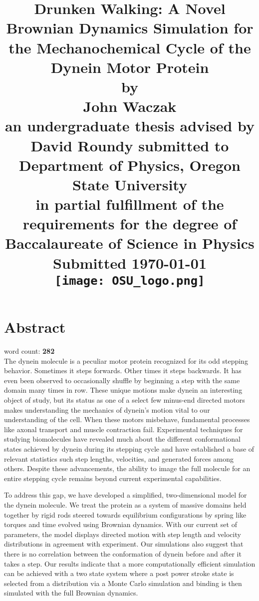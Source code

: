 \documentclass[12pt]{report}
\title{
	\large{Drunken Walking: A Novel Brownian Dynamics Simulation for the Mechanochemical Cycle of the Dynein Motor Protein}\vspace{1.5em}\\
	\normalsize{by}\\
	\large{John Waczak} \vspace{2em}\\ 
	\normalsize{an undergraduate thesis advised by David Roundy submitted to \\ 
		Department of Physics, Oregon State University}\vspace{2em}\\
	\normalsize{in partial fulfillment of the requirements for the degree of}\\
	\normalsize{Baccalaureate of Science in Physics}\vspace{1.5 em}\\
	\normalsize{Submitted \today}\vspace{3em}\\
	\texttt{[image: OSU\_logo.png]}\vspace{0.5em}\\
}
\date{}
\begin{document}
	\onehalfspacing
	
	\maketitle
	\chapter*{Abstract}
	\vspace{-3 em}word count: \textbf{282}\\
	
	The dynein molecule is a peculiar motor protein recognized for its odd stepping behavior. Sometimes it steps forwards. Other times it steps backwards. It has even been observed to occasionally shuffle by beginning a step with the same domain many times in row. These unique motions make dynein an interesting object of study, but its status as one of a select few minus-end directed motors makes understanding the mechanics of dynein’s motion vital to our understanding of the cell. When these motors misbehave, fundamental processes like axonal transport and muscle contraction fail. Experimental techniques for studying biomolecules have revealed much about the different conformational states achieved by dynein during its stepping cycle and have established a base of relevant statistics such step lengths, velocities, and generated forces among others. Despite these advancements, the ability to image the full molecule for an entire stepping cycle remains beyond current experimental capabilities. 
	
	To address this gap, we have developed a simplified, two-dimensional model for the dynein molecule. We treat the protein as a system of massive domains held together by rigid rods steered towards equilibrium configurations by spring like torques and time evolved using Brownian dynamics. With our current set of parameters, the model displays directed motion with step length and velocity distributions in agreement with experiment. Our simulations also suggest that there is no correlation between the conformation of dynein before and after it takes a step. Our results indicate that a more computationally efficient simulation can be achieved with a two state system where a post power stroke state is selected from a distribution via a Monte Carlo simulation and binding is then simulated with the full Brownian dynamics. 
	


	\tableofcontents
	\listoffigures
	
\end{document}
